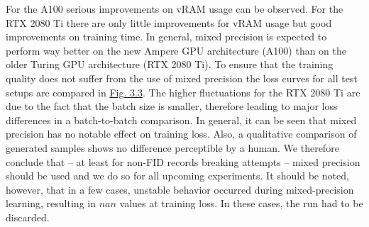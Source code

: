 For the A100 serious improvements on vRAM usage can be observed. For the RTX 2080 Ti there are only little improvements for vRAM usage but good improvements on training time. In general, mixed precision is expected to perform way better on the new Ampere GPU
architecture (A100) than on the older Turing GPU architecture (RTX 2080 Ti). To ensure that the training quality does not suffer from the use of mixed precision the loss curves for all test setups are compared in \hyperref[fig:3.3]{Fig. 3.3}. The higher fluctuations for the RTX 2080 Ti are due to the fact that the batch size is smaller, therefore leading to major loss differences in a batch-to-batch comparison. In general, it can be seen that mixed precision has no notable effect on training loss. Also, a qualitative comparison of generated samples shows no difference perceptible by a human. We therefore conclude that – at least for non-FID records breaking attempts – mixed precision should be used and we do so for all upcoming experiments. It should be noted, however, that in a few cases, unstable behavior occurred during mixed-precision learning, resulting in $nan$ values at training loss. In these cases, the run had to be discarded.
%
